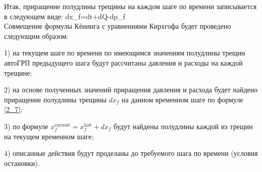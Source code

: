 Итак, приращение полудлины трещины на каждом шаге по времени записывается в следующем виде:
\beq\label{2_7}
dx_{\!f}=dt+dQ-dp_{\!f}
\eeq\\
Совмещение формулы Кёнинга с уравнениями Кирхгофа будет проведено следующим образом:

1) на текущем шаге по времени по имеющимся значениям полудлины трещин автоГРП предыдущего шага будут рассчитаны давления и расходы на каждой трещине;

2) на основе полученных значений приращения давления и расхода будет найдено приращение полудлины трещины $dx_{\!f}$ на данном временном шаге по формуле \eqref{2_7};

3) по формуле $x_{\!f}^{\text{current}}=x_{\!f}^{\text{last}}+dx_{\!f}$ будут найдены полудлины каждой из трещин на текущем временном шаге;

4) описанные действия будут проделаны до требуемого шага по времени (условия остановки).


